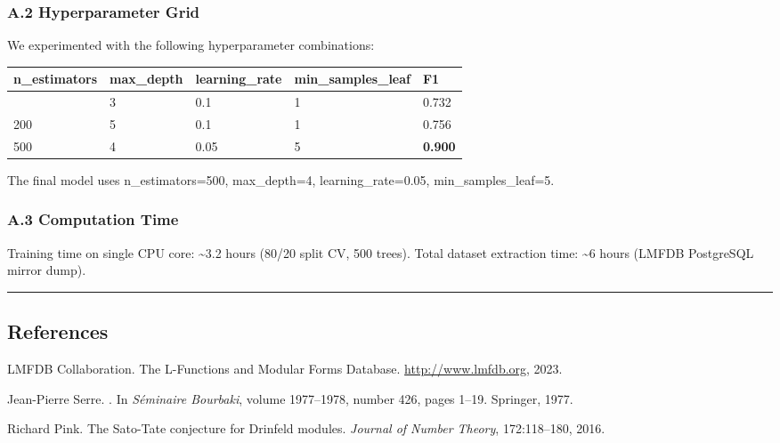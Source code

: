 \documentclass[
]{article}
\begin{document}
\hypertarget{a.2-hyperparameter-grid}{%
\subsubsection{A.2 Hyperparameter Grid}\label{a.2-hyperparameter-grid}}

We experimented with the following hyperparameter combinations:

\begin{longtable}[]{@{}lllll@{}}
\toprule\noalign{}
n\_estimators & max\_depth & learning\_rate & min\_samples\_leaf & F1 \\
\midrule\noalign{}
\endhead
\bottomrule\noalign{}
\endlastfoot
100 & 3 & 0.1 & 1 & 0.732 \\
200 & 5 & 0.1 & 1 & 0.756 \\
500 & 4 & 0.05 & 5 & \textbf{0.900} \\
\end{longtable}

The final model uses n\_estimators=500, max\_depth=4,
learning\_rate=0.05, min\_samples\_leaf=5.

\hypertarget{a.3-computation-time}{%
\subsubsection{A.3 Computation Time}\label{a.3-computation-time}}

Training time on single CPU core: \textasciitilde3.2 hours (80/20 split
CV, 500 trees). Total dataset extraction time: \textasciitilde6 hours
(LMFDB PostgreSQL mirror dump).

\begin{center}\rule{0.5\linewidth}{0.5pt}\end{center}

\hypertarget{references}{%
\subsection{References}\label{references}}

\begin{thebibliography}{9}

LMFDB Collaboration.
\newblock The {L}-Functions and Modular Forms Database.
\newblock \url{http://www.lmfdb.org}, 2023.

Jean-Pierre Serre.
.
\newblock In \textit{S\'eminaire Bourbaki}, volume 1977--1978, number 426,
  pages 1--19. Springer, 1977.

Richard Pink.
\newblock The Sato-Tate conjecture for Drinfeld modules.
\newblock \textit{Journal of Number Theory}, 172:118--180, 2016.

\end{thebibliography}
\end{document}
